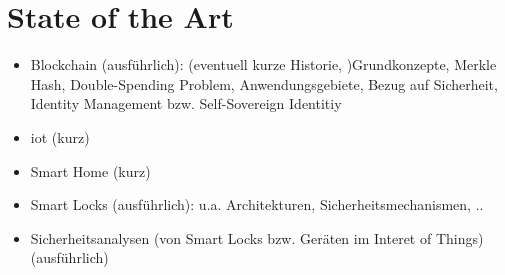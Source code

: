 \section{State of the Art}
    \begin{itemize}
        \item Blockchain (ausführlich): (eventuell kurze Historie, )Grundkonzepte, Merkle Hash, Double-Spending Problem, Anwendungsgebiete, Bezug auf Sicherheit, Identity Management bzw. Self-Sovereign Identitiy
        \item \gls{iot} (kurz)
        \item Smart Home (kurz)
        \item Smart Locks (ausführlich): u.a. Architekturen, Sicherheitsmechanismen, ..
        \item Sicherheitsanalysen (von Smart Locks bzw. Geräten im Interet of Things) (ausführlich)
    \end{itemize}
    
    

 